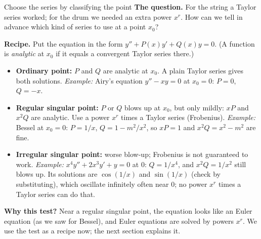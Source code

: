 \documentclass[11pt]{beamer}
\begin{document}
\begin{frame}[allowframebreaks=1.00]{Choose the series by classifying the point}
\footnotesize
\textbf{The question.} For the string a Taylor series worked; for the drum we needed an extra power
\(x^r\). How can we tell in advance which kind of series to use at a point \(x_0\)?

\textbf{Recipe.} Put the equation in the form \(y''+P(x)y'+Q(x)y=0\). (A function is
\emph{analytic} at \(x_0\) if it equals a convergent Taylor series there.)
\begin{itemize}
 \item \textbf{Ordinary point:} \(P\) and \(Q\) are analytic at \(x_0\). A plain Taylor series gives both
       solutions. \emph{Example:} Airy's equation \(y''-xy=0\) at \(x_0=0\): \(P=0\), \(Q=-x\).
 \item \textbf{Regular singular point:} \(P\) or \(Q\) blows up at \(x_0\), but only mildly: \(xP\) and \(x^2Q\) are
       analytic. Use a power \(x^r\) times a Taylor series (Frobenius).
       \emph{Example:} Bessel at \(x_0=0\): \(P=1/x\), \(Q=1-m^2/x^2\), so \(xP=1\) and \(x^2Q=x^2-m^2\) are fine.
 \item \textbf{Irregular singular point:} worse blow-up; Frobenius is not guaranteed to work.
       \emph{Example:} \(x^4y''+2x^3y'+y=0\) at \(0\): \(Q=1/x^4\), and \(x^2Q=1/x^2\) still blows up.
       Its solutions are \(\cos(1/x)\) and \(\sin(1/x)\) (check by substituting), which oscillate
       infinitely often near \(0\); no power \(x^r\) times a Taylor series can do that.
\end{itemize}
\textbf{Why this test?} Near a regular singular point, the equation looks like an Euler equation
(as we saw for Bessel), and Euler equations are solved by powers \(x^r\). We use the test as a recipe
now; the next section explains it.
\end{frame}
\end{document}
